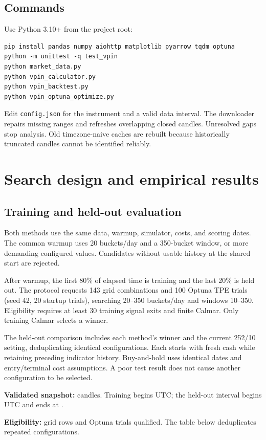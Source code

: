 \documentclass[10pt,a4paper]{article}
\begin{document}
\subsection{Commands}
Use Python 3.10+ from the project root:
\begin{verbatim}
pip install pandas numpy aiohttp matplotlib pyarrow tqdm optuna
python -m unittest -q test_vpin
python market_data.py
python vpin_calculator.py
python vpin_backtest.py
python vpin_optuna_optimize.py
\end{verbatim}
Edit \texttt{config.json} for the instrument and a valid data interval.
The downloader repairs missing ranges and refreshes overlapping closed
candles. Unresolved gaps stop analysis. Old timezone-naive caches are rebuilt
because historically truncated candles cannot be identified reliably.

\clearpage
\section{Search design and empirical results}
\subsection{Training and held-out evaluation}
Both methods use the same data, warmup, simulator, costs, and scoring dates.
The common warmup uses 20 buckets/day and a 350-bucket window, or more
demanding configured values. Candidates without usable history at the shared
start are rejected.

After warmup, the first 80\% of elapsed time is training and the last 20\%
is held out. The protocol requests 143 grid combinations and 100 Optuna TPE trials
(seed 42, 20 startup trials), searching 20--350 buckets/day and windows
10--350. Eligibility requires at least 30 training signal exits and finite
Calmar. Only training Calmar selects a winner.

The held-out comparison includes each method's winner and the current
252/10 setting, deduplicating identical configurations. Each starts with fresh
cash while retaining preceding indicator history. Buy-and-hold uses identical
dates and entry/terminal cost assumptions. A poor test result does not cause
another configuration to be selected.

\ifResultsAvailable
\textbf{Validated snapshot:} \DataRows{} candles.
Training begins \TrainingStart{} UTC; the held-out interval begins
\SplitTime{} UTC and ends at \SnapshotEnd.

\textbf{Eligibility:} \GridEligible{} grid rows and \OptunaEligible{} Optuna
trials qualified. The table below deduplicates repeated configurations.
\WinnerText
\end{document}
